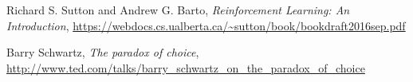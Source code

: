 \documentclass{article}
\begin{document}
\clearpage

\begin{thebibliography}{9}

  Richard S. Sutton and Andrew G. Barto,
  \emph{Reinforcement Learning: An Introduction},
  \url{https://webdocs.cs.ualberta.ca/~sutton/book/bookdraft2016sep.pdf}

  Barry Schwartz,
  \emph{The paradox of choice},
  \url{http://www.ted.com/talks/barry_schwartz_on_the_paradox_of_choice}
  
\end{thebibliography}
\end{document}
